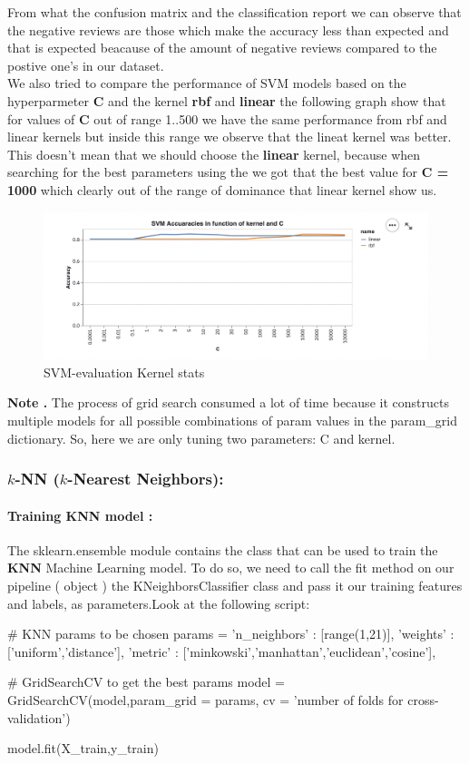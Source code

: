 \documentclass{article}
\begin{document}
From what the confusion matrix and the classification report we can observe that the negative reviews are those which make the accuracy less than expected and that is expected beacause of the amount of negative reviews compared to the postive one's in our dataset.\\
We also tried to compare the performance of SVM models based on the hyperparmeter \textbf{C} and the kernel \textbf{rbf} and \textbf{linear} the following graph show that for values of \textbf{C} out of range  1..500 we have the same performance from rbf and linear kernels but inside this range we observe that the lineat kernel was better.\\
This doesn't mean that we should choose the \textbf{linear} kernel, because when searching for the best parameters using the  we got that the best value for \textbf{C = 1000} which clearly out of the range of dominance that linear kernel show us.
\begin{figure}[H]
    \centering
    \includegraphics[scale=0.65]{src/img/svm_stats.png}
    \caption{SVM-evaluation Kernel stats}
    \label{fig:my_label}
\end{figure}
\textbf{Note .}
The process of grid search consumed a lot of time because it constructs multiple models for all possible combinations of param values in the param\_grid dictionary. So, here we are only tuning two parameters: C and kernel.

\newpage
\subsubsection{ $k$-NN ($k$-Nearest Neighbors):}
\paragraph{ Training KNN model : }
The sklearn.ensemble module contains the  class that can be used to train the \textbf{KNN} Machine Learning model. To do so, we need to call the fit method on our pipeline  (  object ) the KNeighborsClassifier class and pass it our training features and labels, as parameters.Look at the following script:
\begin{code}
# KNN params to be chosen
params = {
    'n_neighbors' : [range(1,21)],
    'weights' : ['uniform','distance'],
    'metric' : ['minkowski','manhattan','euclidean','cosine'],
}

# GridSearchCV to get the best params
model = GridSearchCV(model,param_grid = params, cv = 'number of folds for cross-validation')

model.fit(X_train,y_train)
\end{code}
\end{document}
